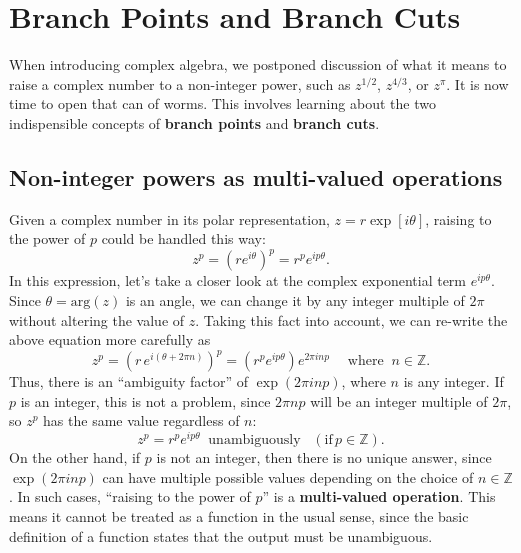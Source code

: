 \documentclass[10pt,a4paper]{article}
\begin{document}
\setcounter{page}{50}

\section{Branch Points and Branch Cuts}
\label{branch-points-and-branch-cuts}

When introducing complex algebra, we postponed discussion of what it
means to raise a complex number to a non-integer power, such as
$z^{1/2}$, $z^{4/3}$, or $z^{\pi}$. It is now time to open that
can of worms. This involves learning about the two indispensible
concepts of \textbf{branch points} and \textbf{branch cuts}.

\subsection{Non-integer powers as multi-valued operations}
\label{non-integer-powers-as-multi-valued-operations}

Given a complex number in its polar representation, $z =
r\exp[i\theta]$, raising to the power of $p$ could be handled this
way:
\begin{equation}
z^p = \left(re^{i\theta}\right)^p = r^p e^{ip\theta}.
\end{equation}
In this expression, let's take a closer look at the complex exponential
term $e^{ip\theta}$. Since $\theta = \mathrm{arg}(z)$ is an angle,
we can change it by any integer multiple of $2\pi$ without altering
the value of $z$. Taking this fact into account, we can re-write the
above equation more carefully as
\begin{equation}
z^p = \left(r\,e^{i(\theta + 2\pi n)}\right)^p = \left(r^p e^{ip\theta} \right) e^{2\pi i n p} \quad\; \mathrm{where}\;\; n\in\mathbb{Z}.
\end{equation}
Thus, there is an ``ambiguity factor'' of $\exp(2\pi i n p)$, where
$n$ is any integer. If $p$ is an integer, this is not a problem,
since $2\pi n p$ will be an integer multiple of $2\pi$, so $z^p$
has the same value regardless of $n$:
\begin{equation}
z^p = r^p e^{ip\theta} \;\;\textrm{unambiguously} \;\;\;(\text{if}\,p\in\mathbb{Z}).
\end{equation}
On the other hand, if $p$ is not an integer, then there is no unique
answer, since $\exp\left(2 \pi i np\right)$ can have multiple possible
values depending on the choice of $n \in \mathbb{Z}$. In such cases,
``raising to the power of $p$'' is a \textbf{multi-valued operation}.
This means it cannot be treated as a function in the usual sense,
since the basic definition of a function states that the output must
be unambiguous.
\end{document}

